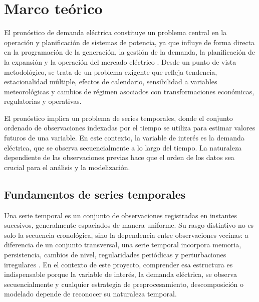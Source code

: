 \section{Marco teórico}

El pronóstico de demanda eléctrica constituye un problema central en la operación y planificación de sistemas de potencia, ya que influye de forma directa en la programación de la generación, la gestión de la demanda, la planificación de la expansión y la operación del mercado eléctrico \parencite{hong2020}. Desde un punto de vista metodológico, se trata de un problema exigente que refleja tendencia, estacionalidad múltiple, efectos de calendario, sensibilidad a variables meteorológicas y cambios de régimen asociados con transformaciones económicas, regulatorias y operativas.

El pronóstico implica un problema de series temporales, donde el conjunto ordenado de observaciones indexadas por el tiempo se utiliza para estimar valores futuros de una variable. En este contexto, la variable de interés es la demanda eléctrica, que se observa secuencialmente a lo largo del tiempo. La naturaleza dependiente de las observaciones previas hace que el orden de los datos sea crucial para el análisis y la modelización.

\subsection{Fundamentos de series temporales}

Una serie temporal es un conjunto de observaciones registradas en instantes sucesivos, generalmente espaciados de manera uniforme. Su rasgo distintivo no es solo la secuencia cronológica, sino la dependencia entre observaciones vecinas: a diferencia de un conjunto transversal, una serie temporal incorpora memoria, persistencia, cambios de nivel, regularidades periódicas y perturbaciones irregulares \parencite{hyndman2021}. En el contexto de este proyecto, comprender esa estructura es indispensable porque la variable de interés, la demanda eléctrica, se observa secuencialmente y cualquier estrategia de preprocesamiento, descomposición o modelado depende de reconocer su naturaleza temporal.

